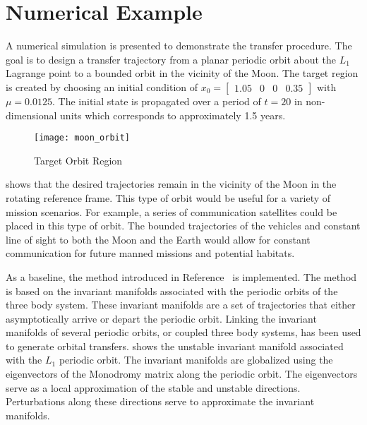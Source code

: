 \documentclass[letterpaper, paper,11pt]{AAS}		%
\begin{document}
\section{Numerical Example}\label{sec:simulation}
A numerical simulation is presented to demonstrate the transfer procedure.
The goal is to design a transfer trajectory from a planar periodic orbit about the \( L_1\) Lagrange point to a bounded orbit in the vicinity of the Moon.
The target region is created by choosing an initial condition of \( x_0 = \begin{bmatrix}1.05 & 0 & 0 & 0.35 \end{bmatrix} \) with \( \mu = 0.0125 \).
The initial state is propagated over a period of \( t = \num{20} \) in non-dimensional units which corresponds to approximately \num{1.5} years.
\begin{figure}[htbp]
   \centering
   \texttt{[image: moon\_orbit]} %
   \caption{Target Orbit Region}
   \label{fig:moon_orbit}
\end{figure}
 shows that the desired trajectories remain in the vicinity of the Moon in the rotating reference frame. 
This type of orbit would be useful for a variety of mission scenarios.
For example, a series of communication satellites could be placed in this type of orbit. 
The bounded trajectories of the vehicles and constant line of sight to both the Moon and the Earth would allow for constant communication for future manned missions and potential habitats.

As a baseline, the method introduced in Reference~ is implemented.
The method is based on the invariant manifolds associated with the periodic orbits of the three body system.
These invariant manifolds are a set of trajectories that either asymptotically arrive or depart the periodic orbit. 
Linking the invariant manifolds of several periodic orbits, or coupled three body systems, has been used to generate orbital transfers.
 shows the unstable invariant manifold associated with the \( L_1\) periodic orbit. 
The invariant manifolds are globalized using the eigenvectors of the Monodromy matrix along the periodic orbit.
The eigenvectors serve as a local approximation of the stable and unstable directions. 
Perturbations along these directions serve to approximate the invariant manifolds.
\end{document}
